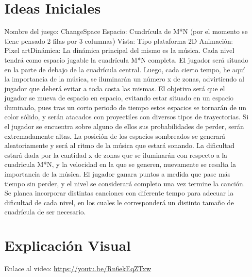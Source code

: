 \documentclass{article}
\begin{document}
\section{Ideas Iniciales}\label{Ideas}
Nombre del juego: ChangeSpace \newline Espacio: Cuadrícula de M*N (por el momento se tiene pensado 2 filas por 3 columnas) \newline Vista: Tipo plataforma 2D \newline Animación: Pixel art\newline Dinámica: La dinámica principal del mismo es la música. Cada nivel tendrá como espacio jugable la cuadrícula M*N completa.  El jugador será situado en la parte de debajo de la cuadrícula central. Luego, cada cierto tempo, he aquí la importancia de la música, se iluminarán un número x de zonas, advirtiendo al jugador que deberá evitar a toda costa las mismas. El objetivo será que el jugador se mueva de espacio en espacio, evitando estar situado en un espacio iluminado, pues tras un corto periodo de tiempo estos espacios se tornarán de un color sólido, y serán atacados con proyectiles con diversos tipos de trayectorias. Si el jugador se encuentra sobre alguno de ellos sus probabilidades de perder, serán extremadamente altas. La posición de los espacios sombreados se generará aleatoriamente y será al ritmo de la música que estará sonando. La dificultad estará dada por la cantidad x de zonas que se iluminarán con respecto a la cuadricula M*N, y la velocidad en la que se generen, nuevamente se resalta la importancia de la música. El jugador ganara puntos a medida que pase más tiempo sin perder, y el nivel se considerará completo una vez termine la canción. \newline Se planea incorporar distintas canciones con diferente tempo para adecuar la dificultad de cada nivel, en los cuales le corresponderá un distinto tamaño de cuadrícula de ser necesario.



\section{Explicación Visual}\label{Video}
Enlace al video: \newline \url{https://youtu.be/Rn6ekEqZTxw}



\end{document}
